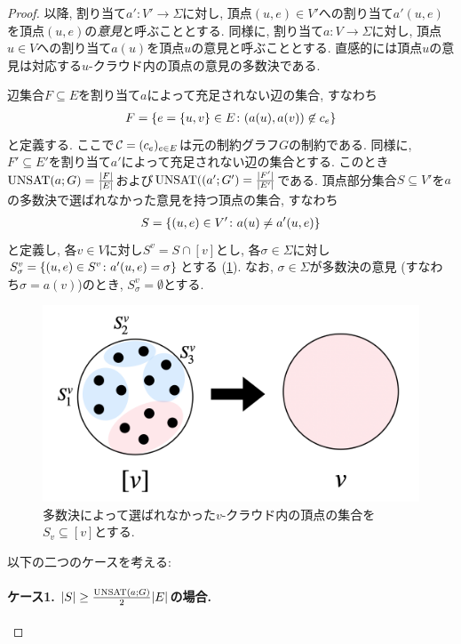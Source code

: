 \begin{proof}
以降, 割り当て$a'\colon V'\to\Sigma$に対し, 頂点$(u,e)\in V'$への割り当て$a'(u,e)$を頂点$(u,e)$の\emph{意見}と呼ぶこととする.
同様に, 割り当て$a\colon V\to\Sigma$に対し, 頂点$u\in V$への割り当て$a(u)$を頂点$u$の意見と呼ぶこととする.
直感的には頂点$u$の意見は対応する$u$-クラウド内の頂点の意見の多数決である.


辺集合$F\subseteq E$を割り当て$a$によって充足されない辺の集合, すなわち
\begin{align*}
  F = \qty{ e=\{u,v\}\in E \colon (a(u),a(v)) \not\in c_e}
\end{align*}
と定義する.
ここで$\mathcal{C} = (c_e)_{e\in E}$は元の制約グラフ$G$の制約である.
同様に, $F'\subseteq E'$を割り当て$a'$によって充足されない辺の集合とする.
このとき$\mathrm{UNSAT}(a;G) = \frac{|F|}{|E|}$および$\mathrm{UNSAT}((a';G') = \frac{|F'|}{|E'|}$である.
頂点部分集合$S\subseteq V'$を$a$の多数決で選ばれなかった意見を持つ頂点の集合, すなわち
\begin{align*}
  S = \qty{ (u,e) \in V' \colon a(u) \ne a'(u,e)}
\end{align*}
と定義し, 各$v\in V$に対し$S^v = S\cap [v]$とし, 各$\sigma\in \Sigma$に対し$S^v_\sigma = \qty{ (u,e)\in S^v \colon a'(u,e)=\sigma }$とする (\cref{fig:majority-degree-reduction}).
なお, $\sigma\in\Sigma$が多数決の意見 (すなわち$\sigma=a(v)$)のとき, $S^v_\sigma=\emptyset$とする.

\begin{figure}[h]
  \centering
  \includegraphics[width=\textwidth]{images/majority_degree_reduction.png}
  \caption{多数決によって選ばれなかった$v$-クラウド内の頂点の集合を$S_v\subseteq [v]$とする. \label{fig:majority-degree-reduction}}
\end{figure}

以下の二つのケースを考える:

\paragraph*{ケース1. $\abs{S} \ge \frac{\mathrm{UNSAT}(a;G)}{2}\abs{E}$の場合.}


\end{proof}
